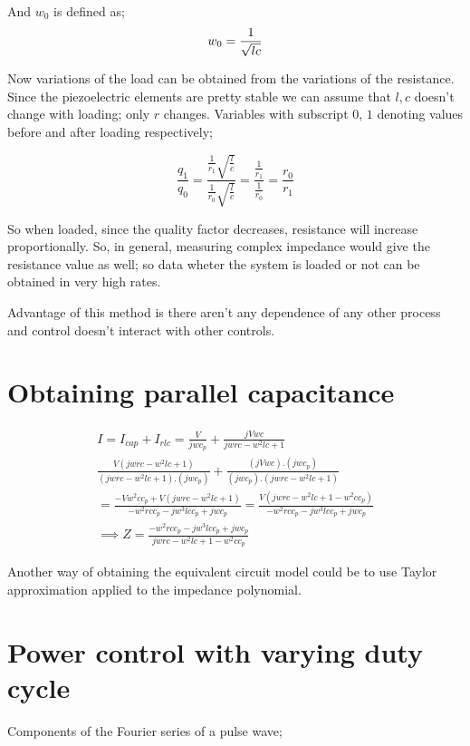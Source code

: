 \documentclass{article}
\begin{document}
And $w_0$ is defined as;
\begin{equation}{\label{def:omegazero}}
    w_0 = \frac{1}{\sqrt{lc}}
\end{equation}

Now variations of the load can be obtained from the variations
of the resistance. Since the piezoelectric elements are pretty stable
we can assume that $l, c$ doesn't change with loading; only $r$
changes. Variables with subscript $0$, $1$ denoting values before and after
loading respectively;

\begin{equation}
    \frac{q_1}{q_0} =
    \frac{\frac{1}{r_1} \sqrt{\frac{l}{c}}}{\frac{1}{r_0} \sqrt{\frac{l}{c}}}
    = \frac{\frac{1}{r_1}}{\frac{1}{r_0}}
    = \frac{r_0}{r_1}
\end{equation}

So when loaded, since the quality factor decreases, resistance will increase
proportionally. So, in general, measuring complex impedance would give the resistance
value as well; so data wheter the system is loaded or not can be obtained in very high
rates.

Advantage of this method is there aren't any dependence of any other process and
control doesn't interact with other controls.

\section{Obtaining parallel capacitance}

\begin{multline}
    I = I_{cap} + I_{rlc} = \frac{V}{jwc_p} + \frac{jVwc}{jwrc - w^2lc +1} \\
    \frac{V(jwrc - w^2lc +1)}{(jwrc - w^2lc +1) . (jwc_p)} + \frac{(jVwc) . (jwc_p)}{(jwc_p).(jwrc - w^2lc +1)} \\
    = \frac{-Vw^2cc_p + V(jwrc - w^2lc +1)}{-w^2rcc_p - jw^3lcc_p +jwc_p}
    = \frac{V(jwrc - w^2lc + 1 - w^2cc_p)}{-w^2rcc_p - jw^3lcc_p +jwc_p} \\
    \implies Z = \frac{-w^2rcc_p - jw^3lcc_p +jwc_p}{jwrc - w^2lc + 1 - w^2cc_p}
\end{multline}

Another way of obtaining the equivalent circuit model could be to use Taylor approximation applied to the
impedance polynomial.

\section{Power control with varying duty cycle}
Components of the Fourier series of a pulse wave;
\end{document}
